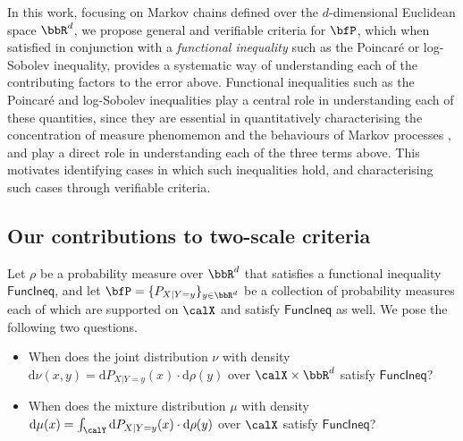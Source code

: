 \documentclass[11pt]{article}
\newcounter{ct}
\newcommand{\rmd}{\mathrm{d}}
\newcommand{\FuncIneq}{\mathsf{FuncIneq}}
\begin{document}
In this work, focusing on Markov chains defined over the \(d\)-dimensional Euclidean space \(\bbR^{d}\), we propose general and verifiable criteria for \(\bfP\), which when satisfied in conjunction with a \emph{functional inequality} such as the Poincar\'{e} or log-Sobolev inequality, provides a systematic way of understanding each of the contributing factors to the error above.
Functional inequalities such as the Poincar\'{e} and log-Sobolev inequalities play a central role in understanding each of these quantities, since they are essential in quantitatively characterising the concentration of measure phenomemon \citep{ledoux2001concentration} and the behaviours of Markov processes \citep{bakry2014analysis}, and play a direct role in understanding each of the three terms above.
This motivates identifying cases in which such inequalities hold, and characterising such cases through verifiable criteria.

\subsection{Our contributions to two-scale criteria}
\label{sec:intro-two-scale}

Let \(\rho\) be a probability measure over \(\bbR^{d}\) that satisfies a functional inequality \(\FuncIneq{}\), and let \(\bfP = \{P_{X | Y = y}\}_{y \in \bbR^{d}}\) be a collection of probability measures each of which are supported on \(\calX\) and satisfy \(\FuncIneq{}\) as well.
We pose the following two questions.
\begin{itemize}
    \item [\textbf{Q1}] When does the joint distribution \(\nu\) with density \(\rmd\nu(x, y) = \rmd P_{X | Y = y}(x) \cdot \rmd\rho(y)\) over \(\calX \times \bbR^{d}\) satisfy \(\FuncIneq{}\)?
    \item [\textbf{Q2}] When does the mixture distribution \(\mu\) with density \(\rmd \mu(x) = \int_{\calY} \rmd P_{X | Y = y}(x) \cdot \rmd \rho(y)\) over \(\calX\) satisfy \(\FuncIneq{}\)?
\end{itemize}
\end{document}
